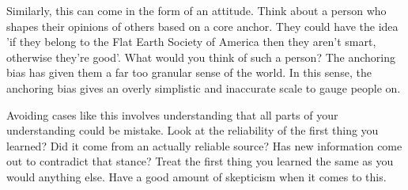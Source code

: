 Similarly, this can come in the form of an attitude. Think about a person who shapes their opinions of others based on a core anchor. They could have the idea 'if they belong to the Flat Earth Society of America then they aren't smart, otherwise they're good'. What would you think of such a person? The anchoring bias has given them a far too granular sense of the world. In this sense, the anchoring bias gives an overly simplistic and inaccurate scale to gauge people on. 

Avoiding cases like this involves understanding that all parts of your understanding could be mistake. Look at the reliability of the first thing you learned? Did it come from an actually reliable source? Has new information come out to contradict that stance? Treat the first thing you learned the same as you would anything else. Have a good amount of skepticism when it comes to this.
